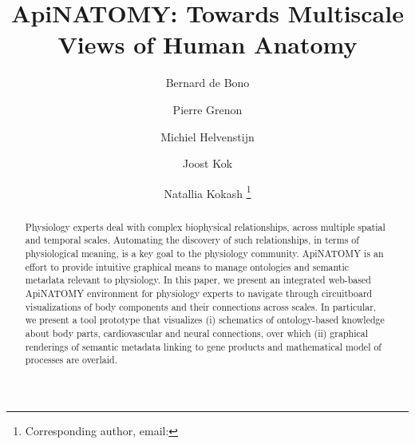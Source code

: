 \documentclass[runningheads]{llncs}
\begin{document}
\title{ApiNATOMY: Towards Multiscale Views of Human Anatomy}

\author{
  Bernard de Bono
  \and
  Pierre Grenon
  \and
  Michiel Helvenstijn
  \and 	
  Joost Kok
  \and
  Natallia Kokash
  \fnmsep
  \thanks{Corresponding author, email: }
}


\maketitle

\setlength{\subfigcapskip}{0.1cm}
\setlength{\abovecaptionskip}{0cm}
\setlength{\belowcaptionskip}{0cm}
\setlength{\textfloatsep}{10pt plus 1.0pt minus 2.0pt}

\begin{abstract}
Physiology experts deal with complex biophysical relationships, across multiple spatial and temporal scales.
Automating the discovery of such relationships, in terms of physiological meaning, is a key goal to the physiology community.
ApiNATOMY is an effort to provide intuitive graphical means to manage ontologies and semantic metadata relevant to physiology. In this paper, we present an integrated web-based ApiNATOMY environment for physiology experts to navigate through circuitboard visualizations of body components and their connections across scales. In particular, we present a tool prototype that visualizes (i) schematics of ontology-based knowledge about body parts, cardiovascular and neural connections, over which (ii) graphical renderings of semantic metadata linking to gene products and mathematical model of processes are overlaid.
\end{abstract}









\end{document}
